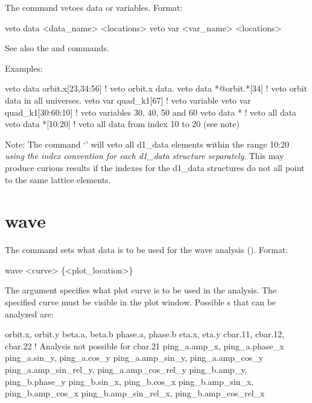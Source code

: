 {{{{{{{{{The  command vetoes data or variables. Format:
\begin{example}
  veto data <data_name> <locations>
  veto var <var_name> <locations>
\end{example}

\vskip 7pt 

See also the  and  commands.

Examples:
\begin{example}
  veto data orbit.x[23,34:56]  ! veto orbit.x data.
  veto data *@orbit.*[34]      ! veto orbit data in all universes.
  veto var quad_k1[67]         ! veto variable
  veto var quad_k1[30:60:10]   ! veto variables 30, 40, 50 and 60
  veto data *                  ! veto all data
  veto data *[10:20]           ! veto all data from index 10 to 20 (see note)
\end{example}

Note: The command `' will veto all d1\_data elements within the
range 10:20 \textit{using the index convention for each d1\_data structure
separately}. This may produce curious results if the indexes for the d1\_data structures
do not all point to the same lattice elements.


\section{wave}
\label{s:wave}

The  command sets what data is to be used for the wave analysis (). 
Format:
\begin{example}
  wave <curve> \{<plot_location>\}
\end{example}

\vskip 7pt

The  argument specifies what plot curve is to be used in the analysis. The specified
curve must be visible in the plot window. Possible s that can be analyzed are:
\begin{example}
  orbit.x, orbit.y
  beta.a,  beta.b
  phase.a, phase.b
  eta.x, eta.y
  cbar.11, cbar.12, cbar.22      ! Analysis not possible for cbar.21
  ping_a.amp_x, ping_a.phase_x
  ping_a.sin_y, ping_a.cos_y
  ping_a.amp_sin_y, ping_a.amp_cos_y
  ping_a.amp_sin_rel_y, ping_a.amp_cos_rel_y
  ping_b.amp_y, ping_b.phase_y
  ping_b.sin_x, ping_b.cos_x
  ping_b.amp_sin_x, ping_b.amp_cos_x
  ping_b.amp_sin_rel_x, ping_b.amp_cos_rel_x
\end{example}

}}}}}}}}}
